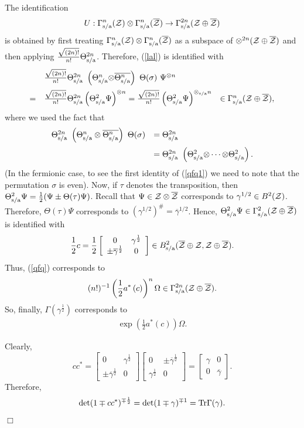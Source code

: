 \documentclass{svmult}
\newcommand{\beq}{\begin{equation}}
\newcommand{\eeq}{\end{equation}}
\def\bar{\overline}
\def\sa{{\rm s/a}}
\def\12{{\frac12}}
\def\cZ{{\cal Z}}
\def\Tr{{\rm Tr}}
\def\qed{$\Box$\medskip}
\def\12{\frac{1}{2}}
\def\Tr{{\rm Tr}}
\def\12{\frac{1}{2}}
\def\t{{\scriptscriptstyle\#}}
\begin{document}
The identification \[U:
 \Gamma_\sa^n(\cZ)\otimes\Gamma_\sa^n(\bar\cZ)\to
 \Gamma_\sa^{2n}(\cZ\oplus\bar\cZ)\]
 is obtained 
  by first treating $\Gamma_\sa^n(\cZ)\otimes\Gamma_\sa^n(\bar\cZ)$ 
 as a subspace of
$\otimes^{2n}(\cZ\oplus\bar\cZ)$ and then applying
$\frac{\sqrt{(2n)!}}{n!}\Theta_\sa^{2n}$. Therefore, (\ref{lal}) is identified
 with
\beq\begin{array}{rll}&\frac{\sqrt{(2n)!}}{n!}\Theta_\sa^{2n}\ 
\left(\Theta_\sa^n{\otimes}\bar{\Theta_\sa^n}\right)\ 
\Theta(\sigma)\ \Psi^{\otimes
  n}&\\[3mm]=&
\frac{\sqrt{(2n)!}}{n!}\Theta_\sa^{2n}
\left(\Theta_\sa^2\Psi\right)^{\otimes
  n}=
\frac{\sqrt{(2n)!}}{n!}\left(\Theta_\sa^2\Psi\right)^{\otimes_\sa
  n}
&
\in\Gamma_\sa^n(\cZ\oplus\bar\cZ),\end{array}\label{qfq}\eeq
where we used the fact that
\beq\begin{array}{rl}
\Theta_\sa^{2n}\ \left(\Theta_\sa^n\otimes\bar{\Theta_\sa^n}\right)\
\Theta(\sigma)&=\Theta_\sa^{2n} \\[3mm]
&=\Theta_\sa^{2n}\ \left(\Theta_\sa^2{\otimes}\cdots{\otimes}\Theta_\sa^2\right)
.\end{array}\label{qfq1}\eeq
(In the fermionic case, to see the first identity of
(\ref{qfq1}) we need to note that the permutation
$\sigma$ is even).
Now, if $\tau$ denotes the transposition, then
 $\Theta_\sa^2\Psi=\frac12(\Psi\pm\Theta(\tau)\Psi)$. 
Recall  that $\Psi\in\cZ\otimes\bar\cZ$  corresponds to
$\gamma^{1/2}\in B^2(\cZ)$. Therefore, $\Theta(\tau)\Psi$ corresponds to
$(\gamma^{1/2})^\t=\bar\gamma^{1/2}$.
Hence,
$\Theta_\sa^2\Psi\in\Gamma_\sa^2(\cZ\oplus\bar\cZ)$  is identified with
\begin{equation}
{\displaystyle\frac12}c={\displaystyle\frac12}
\left[\begin{array}{cc}0&\gamma^\12\\ 
\pm\bar\gamma^\12&0\end{array}\right]\in
B_\sa^2(\bar\cZ\oplus\cZ,\cZ\oplus\bar\cZ). 
\label{rer}\end{equation}
Thus, (\ref{qfq}) corresponds to
\[(n!)^{-1}
\left({\displaystyle\frac12}
a^*\left(c\right)\right)^n\Omega\in\Gamma_\sa^{2n}(\cZ\oplus\bar\cZ).\] 
So, finally,
 $\Gamma(\gamma^{\frac12})$ corresponds to
\[\begin{array}{l}
\exp
\left(\frac12a^*\left(c\right)\right)
\Omega.\end{array}\]



Clearly,
\[cc^*=\left[\begin{array}{cc}0&\gamma^\12\\
\pm\bar\gamma^\12&0\end{array}\right]
\left[\begin{array}{cc}0&\pm\bar\gamma^\12\\
\gamma^\12&0\end{array}\right]
=\left[\begin{array}{cc}\gamma&0\\
0&\bar\gamma\end{array}\right].\]
Therefore,
\[\det(1\mp cc^*)^{\mp\12}=\det(1\mp\gamma)^{\mp1}=\Tr\Gamma(\gamma)
.\]
\qed
\end{document}
